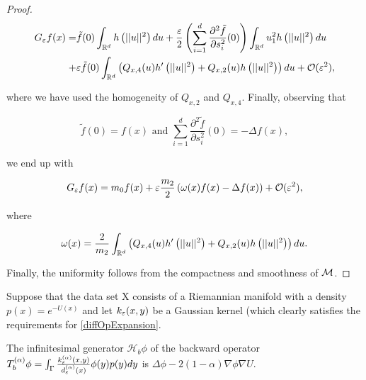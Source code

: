 \begin{proof}
\begin{equation*}\begin{aligned}
G_\varepsilon f(x)=&\tilde{f}(0)\int_{\mathbb{R}^d}h\left(||u||^2 \right)du + \frac{\varepsilon}{2}\left(\sum\limits_{i=1}^d \frac{\partial^2 \tilde{f}}{\partial s_i^2}(0) \right)\int_{\mathbb{R}^d}u_1^2 h\left(||u||^2\right)du \\
+&\varepsilon\tilde{f}(0)\int_{\mathbb{R}^d}\left(Q_{x,4}(u)h'\left(||u||^2\right) + Q_{x,2}(u)h\left(||u||^2\right)\right)du + \mathcal{O}(\varepsilon^2),
\end{aligned}\end{equation*}

where we have used the homogeneity of $Q_{x,2}$ and $Q_{x,4}$. Finally, observing that

\begin{equation*}
\tilde{f}(0) = f(x) \text{ and } \sum_{i=1}^d \frac{\partial^2 \tilde{f}}{\partial s_i^2}(0) = -\Delta f(x),
\end{equation*}

we end up with

\begin{equation*}
G_\varepsilon f(x)=m_0 f(x)+\varepsilon\frac{m_2}{2}\left(\omega(x)f(x)-\Delta f(x) \right)+\mathcal{O}(\varepsilon^2),
\end{equation*}

where

\begin{equation*}
\omega(x)=\frac{2}{m_2}\int_{\mathbb{R}^d}\left(Q_{x,4}(u)h'\left(||u||^2 \right) + Q_{x,2}(u)h\left(||u||^2 \right) \right)du.
\end{equation*}

Finally, the uniformity follows from the compactness and smoothness of $\mathcal{M}$.
\end{proof}


Suppose that the data set X consists of a Riemannian manifold with a density $p(x) = e^{-U(x)}$ and let $k_\varepsilon(x, y)$ be a Gaussian kernel (which clearly satisfies the requirements for \ref{diffOpExpansion}.

\begin{theorem}
The infinitesimal generator $\mathcal{H}_b\phi$ of the backward operator $T_b^{(\alpha)}\phi = \int_\Gamma \frac{k_\varepsilon^{(\alpha)}(x,y)}{d_\varepsilon^{(\alpha)}(x)} \phi(y)p(y)dy $ is $\Delta \phi - 2(1-\alpha)\nabla\phi \nabla U$.
\end{theorem}

